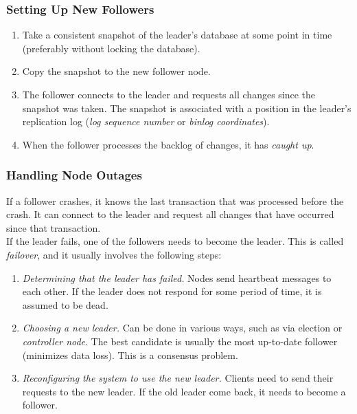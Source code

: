 \documentclass[12pt, titlepage]{article}
\begin{document}
\subsubsection{Setting Up New Followers}

\begin{enumerate}
	\item Take a consistent snapshot of the leader's database at some point in time (preferably without locking the database).
	\item Copy the snapshot to the new follower node.
	\item The follower connects to the leader and requests all changes since the snapshot was taken. The snapshot is associated with a position in the leader's replication log (\textit{log sequence number} or \textit{binlog coordinates}).
	\item When the follower processes the backlog of changes, it has \textit{caught up}.
\end{enumerate}

\subsubsection{Handling Node Outages}

If a follower crashes, it knows the last transaction that was processed before the crash. It can connect to the leader and request all changes that have occurred since that transaction. \\

If the leader fails, one of the followers needs to become the leader. This is called \textit{failover}, and it usually involves the following steps:
\begin{enumerate}
	\item \textit{Determining that the leader has failed.} Nodes send heartbeat messages to each other. If the leader does not respond for some period of time, it is assumed to be dead.
	\item \textit{Choosing a new leader.} Can be done in various ways, such as via election or \textit{controller node}. The best candidate is usually the most up-to-date follower (minimizes data loss). This is a consensus problem.
	\item \textit{Reconfiguring the system to use the new leader.} Clients need to send their requests to the new leader. If the old leader come back, it needs to become a follower.
\end{enumerate}
\end{document}
